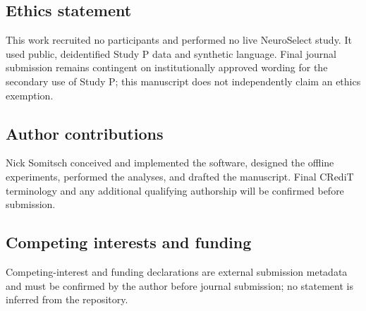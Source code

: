 \documentclass[11pt]{article}
\begin{document}
\subsection{Ethics statement}

This work recruited no participants and performed no live NeuroSelect study. It used public, deidentified Study P data and synthetic language. Final journal submission remains contingent on institutionally approved wording for the secondary use of Study P; this manuscript does not independently claim an ethics exemption.


\subsection{Author contributions}

Nick Somitsch conceived and implemented the software, designed the offline experiments, performed the analyses, and drafted the manuscript. Final CRediT terminology and any additional qualifying authorship will be confirmed before submission.


\subsection{Competing interests and funding}

Competing-interest and funding declarations are external submission metadata and must be confirmed by the author before journal submission; no statement is inferred from the repository.





\end{document}
